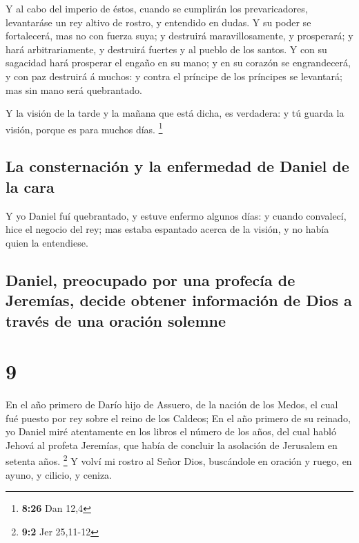  Y al cabo del imperio de éstos, cuando se cumplirán los
prevaricadores, levantaráse un rey altivo de rostro, y entendido en
dudas.  Y su poder se fortalecerá, mas no con fuerza suya;
y destruirá maravillosamente, y prosperará; y hará arbitrariamente, y
destruirá fuertes y al pueblo de los santos.  Y con su
sagacidad hará prosperar el engaño en su mano; y en su corazón se
engrandecerá, y con paz destruirá á muchos: y contra el príncipe de los
príncipes se levantará; mas sin mano será quebrantado.

 Y la visión de la tarde y la mañana que está dicha, es
verdadera: y tú guarda la visión, porque es para muchos días.
\footnote{\textbf{8:26} Dan 12,4}

\hypertarget{la-consternaciuxf3n-y-la-enfermedad-de-daniel-de-la-cara}{%
\subsection{La consternación y la enfermedad de Daniel de la
cara}\label{la-consternaciuxf3n-y-la-enfermedad-de-daniel-de-la-cara}}

 Y yo Daniel fuí quebrantado, y estuve enfermo algunos
días: y cuando convalecí, hice el negocio del rey; mas estaba espantado
acerca de la visión, y no había quien la entendiese.

\hypertarget{daniel-preocupado-por-una-profecuxeda-de-jeremuxedas-decide-obtener-informaciuxf3n-de-dios-a-travuxe9s-de-una-oraciuxf3n-solemne}{%
\subsection{Daniel, preocupado por una profecía de Jeremías, decide
obtener información de Dios a través de una oración
solemne}\label{daniel-preocupado-por-una-profecuxeda-de-jeremuxedas-decide-obtener-informaciuxf3n-de-dios-a-travuxe9s-de-una-oraciuxf3n-solemne}}

\hypertarget{section-8}{%
\section{9}\label{section-8}}

 En el año primero de Darío hijo de Assuero, de la nación de
los Medos, el cual fué puesto por rey sobre el reino de los Caldeos;
 En el año primero de su reinado, yo Daniel miré atentamente
en los libros el número de los años, del cual habló Jehová al profeta
Jeremías, que había de concluir la asolación de Jerusalem en setenta
años. \footnote{\textbf{9:2} Jer 25,11-12}  Y volví mi
rostro al Señor Dios, buscándole en oración y ruego, en ayuno, y
cilicio, y ceniza.

